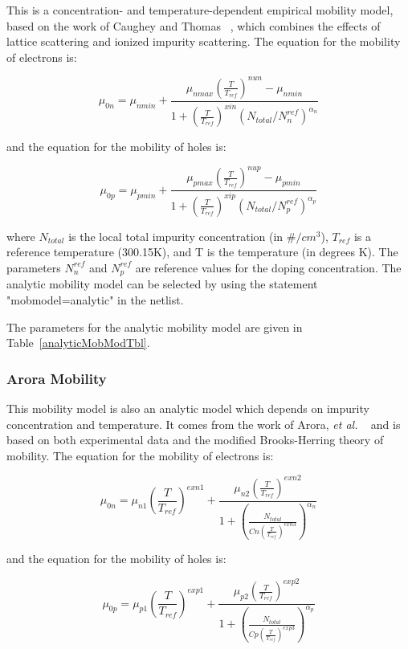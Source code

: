 This is a concentration- and temperature-dependent empirical mobility
model, based on the work of Caughey and Thomas ~\cite{caughey}, which combines the
effects of lattice scattering and ionized 
impurity scattering.  The equation for the mobility of electrons is:

\begin{equation}
     \mu_{0n} = \mu_{nmin} + \frac{\mu_{nmax}(\frac{T}{T_{ref}})^{nun} -
     \mu_{nmin}}{1+(\frac{T}{T_{ref}})^{xin} (N_{total}/N_n^{ref})^{\alpha_{n}}}
\end{equation}

and the equation for the mobility of holes is:

\begin{equation}
     \mu_{0p} = \mu_{pmin} + \frac{\mu_{pmax}(\frac{T}{T_{ref}})^{nup} -
     \mu_{pmin}}{1+(\frac{T}{T_{ref}})^{xip} (N_{total}/N_p^{ref})^{\alpha_{p}}}
\end{equation}

where $N_{total}$ is the local total impurity concentration (in $\#
/cm^{3}$), $T_{ref}$ is a reference temperature (300.15K),
and T is the temperature (in degrees K).  The parameters $N_n^{ref}$ and 
$N_p^{ref}$ are reference values for the doping concentration.  The 
analytic mobility
model can be selected by using the statement "mobmodel=analytic" in the
netlist.  

The parameters for the analytic mobility model are given in Table~\ref{analyticMobModTbl}.
\newpage
{}

\subsubsection{Arora Mobility}

This mobility model is also an analytic model which depends on impurity
concentration and temperature.  It comes from the work of Arora, \emph{et al.}
~\cite{arora} and
is based on both experimental data and the modified Brooks-Herring theory
of mobility.  The equation for the mobility of electrons is:

\begin{equation}
    \mu_{0n} = \mu_{n1}(\frac{T}{T_{ref}})^{exn1} +
    \frac{\mu_{n2}(\frac{T}{T_{ref}})^{exn2}}{1+(\frac{N_{total}}{Cn(\frac{T}{T_{ref}})^{exn3}})^{\alpha_{n}}}
\end{equation}

and the equation for the mobility of holes is:

\begin{equation}
    \mu_{0p} = \mu_{p1}(\frac{T}{T_{ref}})^{exp1} +
    \frac{\mu_{p2}(\frac{T}{T_{ref}})^{exp2}}{1+(\frac{N_{total}}{Cp(\frac{T}{T_{ref}})^{exp3}})^{\alpha_{p}}}
\end{equation}

